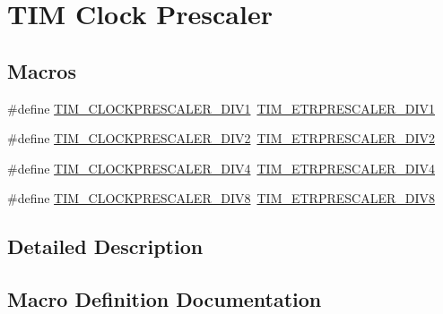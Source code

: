 \hypertarget{group___t_i_m___clock___prescaler}{}\section{T\+IM Clock Prescaler}
\label{group___t_i_m___clock___prescaler}
\subsection*{Macros}
\begin{DoxyCompactItemize}
\item 
\#define \hyperlink{group___t_i_m___clock___prescaler_ga3462b444a059f001c6df33f55c756313}{T\+I\+M\+\_\+\+C\+L\+O\+C\+K\+P\+R\+E\+S\+C\+A\+L\+E\+R\+\_\+\+D\+I\+V1}~\hyperlink{group___t_i_m___e_t_r___prescaler_gabead5364c62645592e42545ba09ab88a}{T\+I\+M\+\_\+\+E\+T\+R\+P\+R\+E\+S\+C\+A\+L\+E\+R\+\_\+\+D\+I\+V1}
\item 
\#define \hyperlink{group___t_i_m___clock___prescaler_gac6457751c882644727982fda1fd029a5}{T\+I\+M\+\_\+\+C\+L\+O\+C\+K\+P\+R\+E\+S\+C\+A\+L\+E\+R\+\_\+\+D\+I\+V2}~\hyperlink{group___t_i_m___e_t_r___prescaler_gaf7fe49f67bdb6b33b9b41953fee75680}{T\+I\+M\+\_\+\+E\+T\+R\+P\+R\+E\+S\+C\+A\+L\+E\+R\+\_\+\+D\+I\+V2}
\item 
\#define \hyperlink{group___t_i_m___clock___prescaler_ga11ce3686a0ee934384d0e4651823883d}{T\+I\+M\+\_\+\+C\+L\+O\+C\+K\+P\+R\+E\+S\+C\+A\+L\+E\+R\+\_\+\+D\+I\+V4}~\hyperlink{group___t_i_m___e_t_r___prescaler_gaa09da30c3cd28f1fe6b6f3f599a5212c}{T\+I\+M\+\_\+\+E\+T\+R\+P\+R\+E\+S\+C\+A\+L\+E\+R\+\_\+\+D\+I\+V4}
\item 
\#define \hyperlink{group___t_i_m___clock___prescaler_ga86f147be5654631b21aa391a001401d5}{T\+I\+M\+\_\+\+C\+L\+O\+C\+K\+P\+R\+E\+S\+C\+A\+L\+E\+R\+\_\+\+D\+I\+V8}~\hyperlink{group___t_i_m___e_t_r___prescaler_ga834e38200874cced108379b17a24d0b7}{T\+I\+M\+\_\+\+E\+T\+R\+P\+R\+E\+S\+C\+A\+L\+E\+R\+\_\+\+D\+I\+V8}
\end{DoxyCompactItemize}


\subsection{Detailed Description}


\subsection{Macro Definition Documentation}
\mbox{\label{group___t_i_m___clock___prescaler_ga3462b444a059f001c6df33f55c756313}} 
